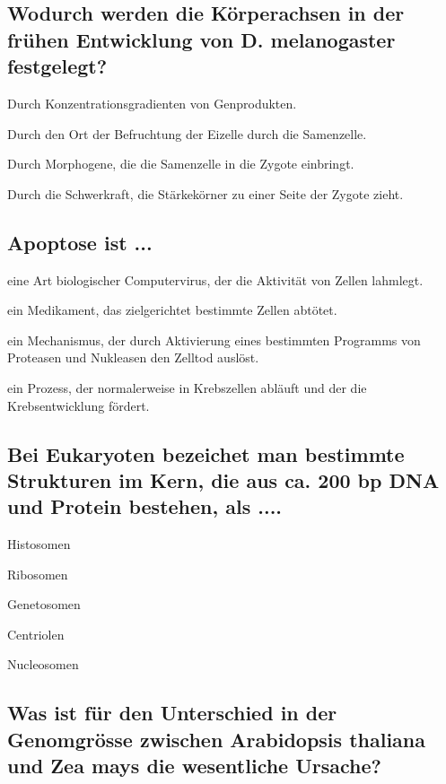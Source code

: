 \documentclass{article}
\begin{document}
\subsection*{Wodurch werden die Körperachsen in der frühen Entwicklung von D.
melanogaster festgelegt?}
\begin{todolist}%
\item Durch Konzentrationsgradienten von Genprodukten.
\item Durch den Ort der Befruchtung der Eizelle durch die Samenzelle.
\item Durch Morphogene, die die Samenzelle in die Zygote einbringt.
\item Durch die Schwerkraft, die Stärkekörner zu einer Seite der Zygote
zieht.
\end{todolist}

\subsection*{Apoptose ist ...}
\begin{todolist}%
\item eine Art biologischer Computervirus, der die Aktivität von Zellen
lahmlegt.  
\item ein Medikament, das zielgerichtet bestimmte Zellen abtötet.  
\item ein Mechanismus, der durch Aktivierung eines bestimmten
Programms von Proteasen und Nukleasen den Zelltod auslöst.  
\item ein Prozess, der normalerweise in Krebszellen abläuft und der die
Krebsentwicklung fördert.  
\end{todolist}

\subsection*{Bei Eukaryoten bezeichet man bestimmte Strukturen im Kern, die aus ca.
200 bp DNA und Protein bestehen, als ....}
\begin{todolist}%
\item Histosomen  
\item Ribosomen  
\item Genetosomen  
\item Centriolen  
\item Nucleosomen
\end{todolist}
 
\subsection*{Was ist für den Unterschied in der Genomgrösse zwischen Arabidopsis
thaliana und Zea mays die wesentliche Ursache?}
\end{document}
